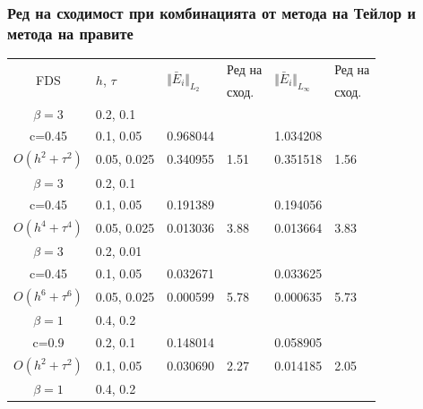 \documentclass[a4paper]{article}
\theoremstyle{remark}
\begin{document}
\subsubsection{Ред на сходимост при комбинацията от метода на Тейлор и метода на правите}
\begin{table}[ht]
\centering
\small
		\begin{tabular}{||c|l|ll|ll||}
			\hline
			\hline


      \multirow{2  }{*}{FDS}        & \multirow{2  }{*}{$h$, $\tau$}  &	\multirow{2  }{*}{  $\Vert \bar E_i \Vert_{L_2} $ } 	&Ред на & \multirow{2  }{*}{  $\Vert \bar E_i \Vert_{L_\infty}$ }	&Ред на   \\
	                                        &                                                &    										&  сход. & 										& сход. \\
\hline 
\hline 
  $\beta=3$               &0.2, 0.1      &              	&           &                	&      \\
   c=0.45                   &0.1, 0.05    &0.968044  	&           &1.034208   &       \\
 $O(h^2 + \tau^ 2)$ 	&0.05, 0.025	& 0.340955 	& 1.51    &0.351518  	&  1.56      \\
\hline 
  $\beta=3$               &0.2, 0.1      &              	&          	&                 &      \\
   c=0.45                   &0.1, 0.05    &0.191389 	&          	&0.194056   	&       \\
$O(h^4+ \tau^4)$	&0.05, 0.025	&0.013036 	& 3.88   	&0.013664   	& 3.83       \\
\hline 
  $\beta=3$               &0.2, 0.01    &                	&          	&                 &      \\
     c=0.45                 &0.1, 0.05    &0.032671 	&          	& 0.033625  	&       \\
  $O(h^6+ \tau^6)$ 	&0.05, 0.025	&0.000599 	&5.78    	& 0.000635  	& 5.73       \\
\hline
\hline 
       $\beta=1$        	&0.4, 0.2      &             	&            &           &   \\
           c=0.9    		&0.2, 0.1      &  0.148014 	&            &0.058905 &   \\
  $O(h^2+ \tau^2)$  	&0.1, 0.05   	& 0.030690  	&2.27  	 &0.014185   & 2.05 \\
\hline
      $\beta=1$           &0.4, 0.2    	&            	&               &             &    \\

\end{tabular}
\end{table}
\end{document}
